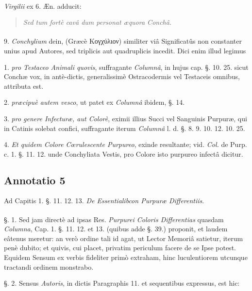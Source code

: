 \documentclass[a4paper, 11pt, oneside, polutonikogreek, german]{article}
\begin{document}
\paragraph{}
\emph{Virgilii} ex 6. Æn. adducit:
\begin{quotation}
\emph{Sed tum fortè cavâ dum personat æquora Conchâ.}  
\end{quotation}
\paragraph{}
9. \emph{Conchylium} dein, (Græcè Κογχύλιον) similiter viâ Significatûs non constanter unius apud Autores, sed triplicis aut quadruplicis incedit. Dici enim illud legimus

1. \emph{pro Testaceo Animali quovis}, suffragante \emph{Columnâ}, in hujus cap. §. 10. 25. sicut Conchæ vox, in antè-dictis, generalissimè Ostracodermis vel Testaceis omnibus, attributa est.

2. \emph{præcipuè autem vesco}, ut patet ex \emph{Columnâ} ibidem, §. 14.

3. \emph{pro genere Infecturæ, aut Colorè}, eximii illius Succi vel Sanguinis Purpuræ, qui in Catinis solebat confici, suffragante iterum \emph{Columnâ} l. d. §. 8. 9. 10. 12. 10. 25.

4. \emph{Et quidem Colore Cœrulescente Purpureo}, exinde resultante; vid. \emph{Col.} de Purp. c. 1. §. 11. 12. unde Conchyliata Vestis, pro Colore isto purpureo infectâ dicitur.

\subsection{Annotatio 5}
\begin{center}
Ad Capitis 1. §. 11. 12. 13. \emph{De Essentialibcon Purpuræ Differentiis}.
\end{center}
\paragraph{}
§. 1. Sed jam directè ad ipsas Res. \emph{Purpurei Coloris Differentias} quasdam \emph{Columna}, Cap. 1. §. 11. 12. et 13. (quibus adde §. 39.) proponit, et laudem eâtenus meretur: an verò ordine tali id agat, ut Lector Memoriâ satietur, iterum penè dubito; et quivis, cui placet, privatim periculum facere de se Ipse potest. Equidem Sensum ex verbis fideliter primò extraham, hinc luculentiorem utcunque tractandi ordinem monstrabo.

§. 2. Sensus \emph{Autoris}, in dictis Paragraphis 11. et sequentibus expressus, est hic:
\end{document}
